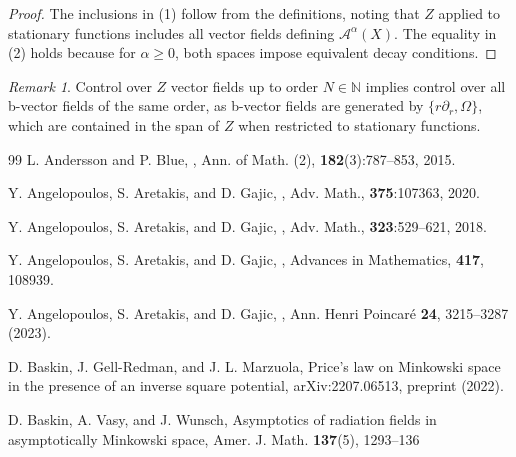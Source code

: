 \documentclass[10pt,a4paper,reqno]{amsart}
\theoremstyle{definition}
\theoremstyle{remark}
\newtheorem{remark}[theorem]{Remark}
\numberwithin{equation}{section}
\begin{document}
\begin{proof}
The inclusions in (1) follow from the definitions, noting that $Z$ applied to stationary functions includes all vector fields defining $\mathcal{A}^\alpha(X)$. The equality in (2) holds because for $\alpha \geq 0$, both spaces impose equivalent decay conditions.
\end{proof}

\begin{remark}\label{rem:b_vector_fields}
Control over $Z$ vector fields up to order $N \in \mathbb{N}$ implies control over all b-vector fields of the same order, as b-vector fields are generated by $\{r\partial_r, \Omega\}$, which are contained in the span of $Z$ when restricted to stationary functions.
\end{remark}

\begin{thebibliography}{99}
 L. Andersson and P. Blue,
,
\newblock Ann. of Math. (2), \textbf{182}(3):787--853, 2015.

 Y. Angelopoulos, S. Aretakis, and D. Gajic, 
, 
\newblock Adv. Math., \textbf{375}:107363, 2020.

 Y. Angelopoulos, S. Aretakis, and D. Gajic, 
,
\newblock Adv. Math., \textbf{323}:529--621, 2018.

 Y. Angelopoulos, S. Aretakis, and D. Gajic, 
,
\newblock Advances in Mathematics, \textbf{417}, 108939. %

 Y. Angelopoulos, S. Aretakis, and D. Gajic, 
,
\newblock Ann. Henri Poincaré \textbf{24}, 3215–3287 (2023). 

 D. Baskin, J. Gell-Redman, and J. L. Marzuola,
\newblock Price’s law on Minkowski space in the presence of an inverse square potential,
\newblock arXiv:2207.06513, preprint (2022).

 D. Baskin, A. Vasy, and J. Wunsch,
\newblock Asymptotics of radiation fields in asymptotically Minkowski space,
\newblock Amer. J. Math. \textbf{137}(5), 1293–136


\end{thebibliography}
\end{document}
